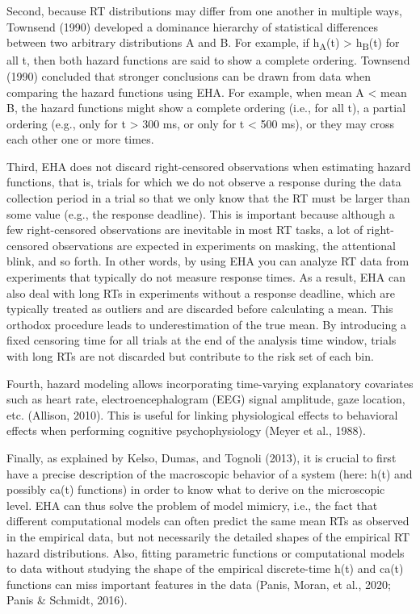 \documentclass[
  man, donotrepeattitle,floatsintext]{apa6}
\begin{document}
Second, because RT distributions may differ from one another in multiple ways, Townsend (1990) developed a dominance hierarchy of statistical differences between two arbitrary distributions A and B. For example, if h\textsubscript{A}(t) \textgreater{} h\textsubscript{B}(t) for all t, then both hazard functions are said to show a complete ordering. Townsend (1990) concluded that stronger conclusions can be drawn from data when comparing the hazard functions using EHA. For example, when mean A \textless{} mean B, the hazard functions might show a complete ordering (i.e., for all t), a partial ordering (e.g., only for t \textgreater{} 300 ms, or only for t \textless{} 500 ms), or they may cross each other one or more times.

Third, EHA does not discard right-censored observations when estimating hazard functions, that is, trials for which we do not observe a response during the data collection period in a trial so that we only know that the RT must be larger than some value (e.g., the response deadline). This is important because although a few right-censored observations are inevitable in most RT tasks, a lot of right-censored observations are expected in experiments on masking, the attentional blink, and so forth. In other words, by using EHA you can analyze RT data from experiments that typically do not measure response times. As a result, EHA can also deal with long RTs in experiments without a response deadline, which are typically treated as outliers and are discarded before calculating a mean. This orthodox procedure leads to underestimation of the true mean. By introducing a fixed censoring time for all trials at the end of the analysis time window, trials with long RTs are not discarded but contribute to the risk set of each bin.

Fourth, hazard modeling allows incorporating time-varying explanatory covariates such as heart rate, electroencephalogram (EEG) signal amplitude, gaze location, etc. (Allison, 2010). This is useful for linking physiological effects to behavioral effects when performing cognitive psychophysiology (Meyer et al., 1988).

Finally, as explained by Kelso, Dumas, and Tognoli (2013), it is crucial to first have a precise description of the macroscopic behavior of a system (here: h(t) and possibly ca(t) functions) in order to know what to derive on the microscopic level. EHA can thus solve the problem of model mimicry, i.e., the fact that different computational models can often predict the same mean RTs as observed in the empirical data, but not necessarily the detailed shapes of the empirical RT hazard distributions. Also, fitting parametric functions or computational models to data without studying the shape of the empirical discrete-time h(t) and ca(t) functions can miss important features in the data (Panis, Moran, et al., 2020; Panis \& Schmidt, 2016).
\end{document}
